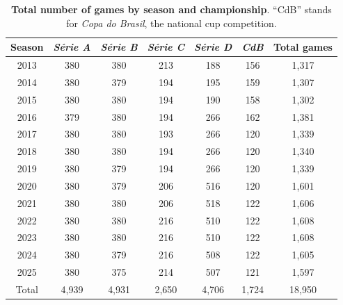 \begin{table}[htbp]
    \centering
    \begin{tabular}{ccccccc}
        \toprule
        Season & \textit{Série A} & \textit{Série B} & \textit{Série C} & \textit{Série D} & \textit{CdB} & Total games \\
        \midrule
        2013   & 380   & 380   & 213   & 188   & 156   & 1,317  \\
        2014   & 380   & 379   & 194   & 195   & 159   & 1,307  \\
        2015   & 380   & 380   & 194   & 190   & 158   & 1,302  \\
        2016   & 379   & 380   & 194   & 266   & 162   & 1,381  \\
        2017   & 380   & 380   & 193   & 266   & 120   & 1,339  \\
        2018   & 380   & 380   & 194   & 266   & 120   & 1,340  \\
        2019   & 380   & 379   & 194   & 266   & 120   & 1,339  \\
        2020   & 380   & 379   & 206   & 516   & 120   & 1,601  \\
        2021   & 380   & 380   & 206   & 518   & 122   & 1,606  \\
        2022   & 380   & 380   & 216   & 510   & 122   & 1,608  \\
        2023   & 380   & 380   & 216   & 510   & 122   & 1,608  \\
        2024   & 380   & 379   & 216   & 508   & 122   & 1,605  \\
        2025   & 380   & 375   & 214   & 507   & 121   & 1,597  \\
        \midrule
        Total  & 4,939 & 4,931 & 2,650 & 4,706 & 1,724 & 18,950 \\
        \bottomrule
    \end{tabular}
    \caption{
        \textbf{Total number of games by season and championship}.
        ``CdB'' stands for \textit{Copa do Brasil}, the national cup competition.
    }
    \label{tab:total_games}
\end{table}

